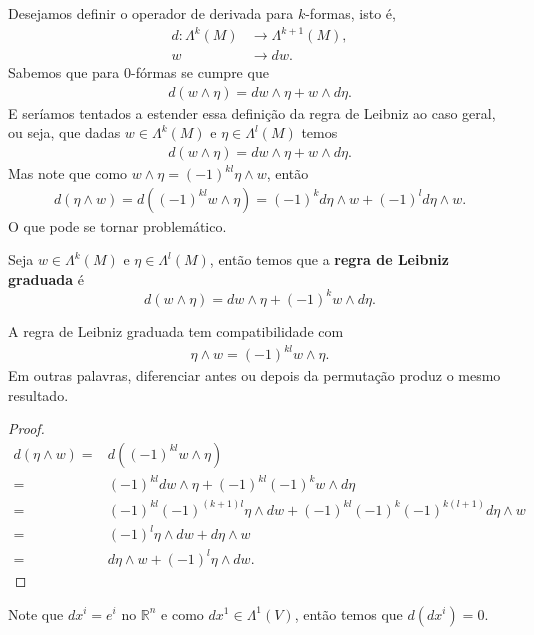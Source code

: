 Desejamos definir o operador de derivada para $k$-formas, isto é,
\begin{align*}
  d:\Lambda^{k}(M)&\to\Lambda^{k+1}(M),\\
                 w&\to dw.
\end{align*}
Sabemos que para $0$-fórmas se cumpre que
\begin{align*}
  d(w\wedge\eta)=dw\wedge\eta + w\wedge d\eta.
\end{align*}
E seríamos tentados a estender essa definição da regra de Leibniz ao caso geral, ou seja, que dadas $w\in\Lambda^{k}(M)$ e $\eta\in\Lambda^{l}(M)$ temos
\begin{align*}
  d(w\wedge\eta)=dw\wedge\eta + w\wedge d\eta.
\end{align*}
Mas note que como $w\wedge\eta=(-1)^{kl}\eta\wedge w$, então
\begin{align*}
  d(\eta\wedge w)=d((-1)^{kl}w\wedge \eta)=(-1)^{k}d\eta\wedge w+(-1)^{l}d\eta\wedge w.
\end{align*}
O que pode se tornar problemático.
\begin{definition}
  Seja $w\in\Lambda^{k}(M)$ e $\eta\in\Lambda^{l}(M)$, então temos que a \textbf{regra de Leibniz graduada} é 
  $$d(w\wedge \eta)=dw\wedge\eta+(-1)^{k}w\wedge d\eta.$$
\end{definition}
\begin{proposition}
  A regra de Leibniz graduada tem compatibilidade com
  \begin{align*}
    \eta\wedge w=(-1)^{kl}w\wedge\eta.
  \end{align*}
  Em outras palavras, diferenciar antes ou depois da permutação produz o mesmo resultado.
\end{proposition}
\begin{proof} 
  \begin{align*}
    d(\eta\wedge w)=&d((-1)^{kl}w\wedge\eta)\\
    =&(-1)^{kl}dw\wedge\eta +(-1)^{kl}(-1)^{k}w\wedge d\eta\\
    =&(-1)^{kl}(-1)^{(k+1)l}\eta\wedge dw+(-1)^{kl}(-1)^{k}(-1)^{k(l+1)}d\eta\wedge w\\
    =&(-1)^{l}\eta\wedge dw+ d\eta\wedge w\\
    =&d\eta\wedge w+(-1)^{l}\eta\wedge dw.
  \end{align*}  
\end{proof}
Note que $dx^{i}=e^{i}$ no $\mathbb{R}^{n}$ e como $dx^{1}\in\Lambda^{1}(V)$, então temos que $d(dx^{i})=0$.\\

